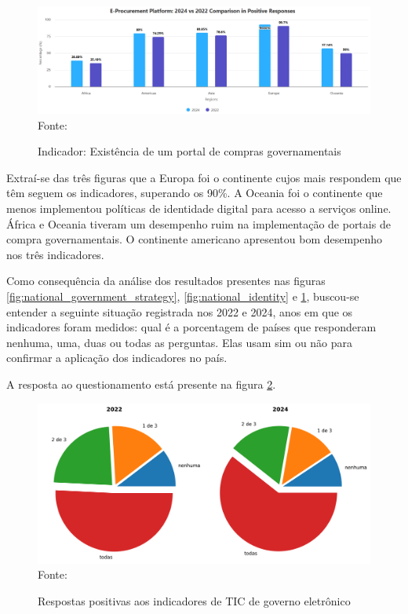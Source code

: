 \begin{figure}[H]
	\centering
	\caption{Indicador: Existência de um portal de compras governamentais}
	\includegraphics[width=1\linewidth]{figuras/ict_in_government/procurement_portal}
	\label{fig:procurement_portal}
	\footnotesize{Fonte: \cite{ONU_ICT_in_government_indicators}}
\end{figure}

Extraí-se das três figuras que a Europa foi o continente cujos mais respondem que têm seguem os indicadores, superando os 90\%. A Oceania foi o continente que menos implementou políticas de identidade digital para acesso a serviços online. África e Oceania tiveram um desempenho ruim na implementação de portais de compra governamentais. O continente americano apresentou bom desempenho nos três indicadores.

Como consequência da análise dos resultados presentes nas figuras \ref{fig:national_government_strategy}, \ref{fig:national_identity} e \ref{fig:procurement_portal}, buscou-se entender a seguinte situação registrada nos 2022 e 2024, anos em que os indicadores foram medidos: qual é a porcentagem de países que responderam nenhuma, uma, duas ou todas as perguntas. Elas usam sim ou não para confirmar a aplicação dos indicadores no país.

A resposta ao questionamento está presente na figura \ref{fig:indicators_answer}.

\begin{figure}[H]
	\centering
	\caption{Respostas positivas aos indicadores de TIC de governo eletrônico}
	\includegraphics[width=1\linewidth]{figuras/ict_in_government/indicators_answer}
	\label{fig:indicators_answer}
	\footnotesize{Fonte: \cite{ONU_ICT_in_government_indicators}}
\end{figure}

